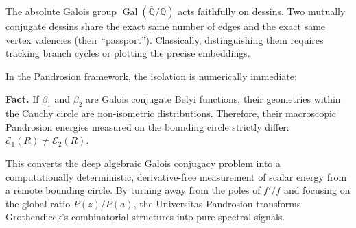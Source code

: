\documentclass[10pt,a4paper,oneside]{book}
\theoremstyle{definition}
\theoremstyle{remark}
\begin{document}
The absolute Galois group $\operatorname{Gal}(\overline{\mathbb{Q}}/\mathbb{Q})$ acts faithfully on dessins. Two mutually conjugate dessins share the exact same number of edges and the exact same vertex valencies (their ``passport''). Classically, distinguishing them requires tracking branch cycles or plotting the precise embeddings.

In the Pandrosion framework, the isolation is numerically immediate:

\textbf{Fact.} If $\beta_1$ and $\beta_2$ are Galois conjugate Belyi functions, their geometries within the Cauchy circle are non-isometric distributions. Therefore, their macroscopic Pandrosion energies measured on the bounding circle strictly differ: $\mathcal{E}_1(R) \neq \mathcal{E}_2(R)$.

This converts the deep algebraic Galois conjugacy problem into a computationally deterministic, derivative-free measurement of scalar energy from a remote bounding circle. By turning away from the poles of $f'/f$ and focusing on the global ratio $P(z)/P(a)$, the Universitas Pandrosion transforms Grothendieck's combinatorial structures into pure spectral signals.
\end{document}
